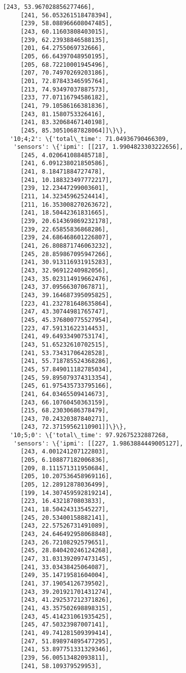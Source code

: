 \documentclass[11pt]{article}
\begin{document}
\begin{tcolorbox}[breakable, size=fbox, boxrule=.5pt, pad at break*=1mm, opacityfill=0]
\begin{Verbatim}[commandchars=\\\{\}]
     [243, 53.967028856277466],
     [241, 56.053261518478394],
     [239, 58.088966608047485],
     [243, 60.11603808403015],
     [239, 62.23938846588135],
     [201, 64.2755069732666],
     [205, 66.64397048950195],
     [205, 68.72210001945496],
     [207, 70.74970269203186],
     [201, 72.87843346595764],
     [213, 74.93497037887573],
     [233, 77.07116794586182],
     [241, 79.10586166381836],
     [243, 81.1580753326416],
     [241, 83.32068467140198],
     [245, 85.30510687828064]]\}\},
  '10;4;2': \{'total\_time': 71.04936790466309,
   'sensors': \{'ipmi': [[217, 1.9904823303222656],
     [245, 4.020641088485718],
     [241, 6.091238021850586],
     [241, 8.18471884727478],
     [241, 10.188323497772217],
     [239, 12.23447299003601],
     [211, 14.32345962524414],
     [211, 16.353008270263672],
     [241, 18.50442361831665],
     [239, 20.614369869232178],
     [239, 22.65855836868286],
     [239, 24.686468601226807],
     [241, 26.808871746063232],
     [245, 28.859867095947266],
     [241, 30.913116931915283],
     [243, 32.96912240982056],
     [243, 35.023114919662476],
     [243, 37.09566307067871],
     [243, 39.164687395095825],
     [223, 41.232781648635864],
     [247, 43.30744981765747],
     [245, 45.376800775527954],
     [223, 47.59131622314453],
     [241, 49.64933490753174],
     [243, 51.65232610702515],
     [241, 53.73431706428528],
     [241, 55.718785524368286],
     [245, 57.849011182785034],
     [245, 59.895079374313354],
     [245, 61.975435733795166],
     [241, 64.03465509414673],
     [243, 66.10760450363159],
     [215, 68.23030686378479],
     [243, 70.24320387840271],
     [243, 72.37159562110901]]\}\},
  '10;5;0': \{'total\_time': 97.92675232887268,
   'sensors': \{'ipmi': [[227, 1.9863884449005127],
     [243, 4.001241207122803],
     [205, 6.108877182006836],
     [209, 8.111571311950684],
     [205, 10.207536458969116],
     [205, 12.28912878036499],
     [199, 14.307459592819214],
     [223, 16.4321870803833],
     [241, 18.50424313545227],
     [245, 20.53400158882141],
     [243, 22.57526731491089],
     [243, 24.646492958068848],
     [243, 26.72108292579651],
     [245, 28.840420246124268],
     [247, 31.031392097473145],
     [241, 33.03438425064087],
     [249, 35.14719581604004],
     [241, 37.19054126739502],
     [243, 39.201921701431274],
     [243, 41.292537212371826],
     [241, 43.357502698898315],
     [243, 45.414231061935425],
     [245, 47.50323987007141],
     [241, 49.741281509399414],
     [247, 51.898974895477295],
     [241, 53.897751331329346],
     [239, 56.00513482093811],
     [241, 58.109379529953],

\end{Verbatim}
\end{tcolorbox}
\end{document}

